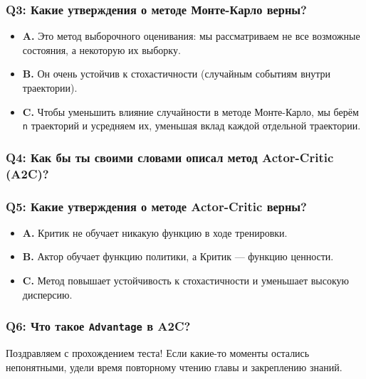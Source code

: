 \documentclass[11pt,a4paper]{article}
\begin{document}
\subsubsection{Q3: Какие утверждения о методе Монте-Карло верны?}\label{q3-which-of-the-following-statements-are-true-about-monte-carlo-method}

\begin{itemize}
\tightlist
\item
  \textbf{A.} Это метод выборочного оценивания: мы рассматриваем не все возможные состояния, а некоторую их выборку.
\item
  \textbf{B.} Он очень устойчив к стохастичности (случайным событиям внутри траектории).
\item
  \textbf{C.} Чтобы уменьшить влияние случайности в методе Монте-Карло, мы берём \texttt{n} траекторий и усредняем их, уменьшая вклад каждой отдельной траектории.
\end{itemize}

\subsubsection{Q4: Как бы ты своими словами описал метод Actor-Critic (A2C)?}\label{q4-how-would-you-describe-with-your-own-words-the-actor-critic-method-a2c}

\subsubsection{Q5: Какие утверждения о методе Actor-Critic верны?}\label{q5-which-of-the-following-statements-are-true-about-the-actor-critic-method}

\begin{itemize}
\tightlist
\item
  \textbf{A.} Критик не обучает никакую функцию в ходе тренировки.
\item
  \textbf{B.} Актор обучает функцию политики, а Критик --- функцию ценности.
\item
  \textbf{C.} Метод повышает устойчивость к стохастичности и уменьшает высокую дисперсию.
\end{itemize}

\subsubsection{Q6: Что такое \texttt{Advantage} в A2C?}\label{q6-what-is-advantage-in-the-a2c-method}

Поздравляем с прохождением теста! Если какие-то моменты остались непонятными, удели время повторному чтению главы и закреплению знаний.
\end{document}
